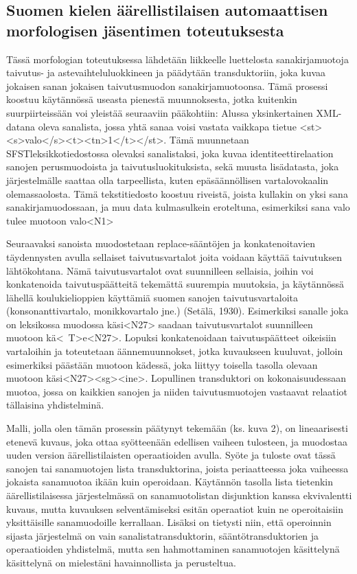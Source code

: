 \documentclass[free]{flammie}
\begin{document}
\subsection{Suomen kielen äärellistilaisen automaattisen morfologisen
jäsentimen toteutuksesta}

Tässä morfologian toteutuksessa lähdetään liikkeelle luettelosta sanakirjamuotoja taivutus- ja astevaihteluluokkineen ja päädytään transduktoriin, joka kuvaa jokaisen sanan jokaisen taivutusmuodon sanakirjamuotoonsa. Tämä prosessi koostuu käytännössä useasta pienestä muunnoksesta, jotka kuitenkin suurpiirteissään voi yleistää seuraaviin pääkohtiin: Alussa yksinkertainen XML-datana oleva sanalista, jossa yhtä sanaa voisi vastata vaikkapa tietue <st><s>valo</s><t><tn>1</t></st>. Tämä muunnetaan SFSTleksikkotiedostossa olevaksi sanalistaksi, joka kuvaa identiteettirelaation sanojen
perusmuodoista ja taivutusluokituksista, sekä muusta lisädatasta, joka järjestelmälle saattaa olla tarpeellista, kuten epäsäännöllisen vartalovokaalin olemassaolosta. Tämä tekstitiedosto koostuu riveistä, joista kullakin on yksi sana sanakirjamuodossaan, ja muu data kulmasulkein eroteltuna, esimerkiksi sana valo tulee
muotoon valo<N1>

Seuraavaksi sanoista muodostetaan replace-sääntöjen ja konkatenoitavien täydennysten avulla sellaiset taivutusvartalot joita voidaan käyttää taivutuksen lähtökohtana. Nämä taivutusvartalot ovat suunnilleen sellaisia, joihin voi konkatenoida
taivutuspäätteitä tekemättä suurempia muutoksia, ja käytännössä lähellä koulukielioppien käyttämiä suomen sanojen taivutusvartaloita (konsonanttivartalo, monikkovartalo jne.) (Setälä, 1930). Esimerkiksi sanalle joka on leksikossa muodossa käsi<N27> saadaan taivutusvartalot suunnilleen muotoon kä<~T>e<N27>.
Lopuksi konkatenoidaan taivutuspäätteet oikeisiin vartaloihin ja toteutetaan äännemuunnokset, jotka kuvaukseen kuuluvat, jolloin esimerkiksi päästään muotoon
kädessä, joka liittyy toisella tasolla olevaan muotoon käsi<N27><sg><ine>.
Lopullinen transduktori on kokonaisuudessaan muotoa, jossa on kaikkien sanojen
ja niiden taivutusmuotojen vastaavat relaatiot tällaisina yhdistelminä.

Malli, jolla olen tämän prosessin päätynyt tekemään (ks. kuva 2), on lineaarisesti
etenevä kuvaus, joka ottaa syötteenään edellisen vaiheen tulosteen, ja muodostaa uuden version äärellistilaisten operaatioiden avulla. Syöte ja tuloste ovat tässä
sanojen tai sanamuotojen lista transduktorina, joista periaatteessa joka vaiheessa
jokaista sanamuotoa ikään kuin operoidaan. Käytännön tasolla lista tietenkin äärellistilaisessa järjestelmässä on sanamuotolistan disjunktion kanssa ekvivalentti
kuvaus, mutta kuvauksen selventämiseksi esitän operaatiot kuin ne operoitaisiin
yksittäisille sanamuodoille kerrallaan. Lisäksi on tietysti niin, että operoinnin sijasta järjestelmä on vain sanalistatransduktorin, sääntötransduktorien ja operaatioiden yhdistelmä, mutta sen hahmottaminen sanamuotojen käsittelynä käsittelynä on mielestäni havainnollista ja perusteltua.
\end{document}
